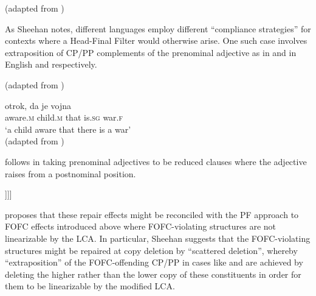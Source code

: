 \documentclass[output=paper]{langscibook}
\begin{document}
\ea\label{ex:haddican:14} 
 \begin{xlista}
 \end{xlista}
 (adapted from \citealt{williams1982})
\z

As Sheehan notes, different languages employ different ``compliance strategies'' for contexts where a Head-Final Filter would otherwise arise.  One such case involves  extraposition of CP/PP complements of the prenominal adjective as in  and  in English and  respectively.

\ea\protect\label{extraposition1} 
\begin{xlista}
\end{xlista}
(adapted from \citealt{sheehan2012fofchff})\\
\z
 
\ea \protect\label{extraposition2}  
 {otrok,} {da} {je} {vojna} \\
      aware.\textsc{m} child.\textsc{m} that is.\textsc{sg} war.\textsc{f}\\
\glt `a child aware that there is a war'\\
(adapted from \citealt{sheehan2012fofchff})\\
\z

\citet{sheehan2012fofchff} follows \citet{Kayne1994} in taking prenominal adjectives to be reduced  clauses where the adjective raises from a postnominal position. 
 
\ea\relax [\textsubscript{DP} [\textsubscript{CP} [\textsubscript{AP} Adj [\textsubscript{NP} Noun \st{AP} ]]]] \z

\cite{sheehan2012fofchff} proposes that these repair effects might be reconciled with the PF approach to FOFC effects introduced above where FOFC-violating structures are not linearizable by the LCA.  In particular, Sheehan  suggests that the FOFC-violating structures might be repaired at copy deletion by ``scattered deletion'', whereby  ``extraposition'' of the FOFC-offending CP\slash PP in cases like  and  are achieved by deleting the higher rather than the lower copy of these constituents in order for them to be linearizable by the modified LCA.
\end{document}
